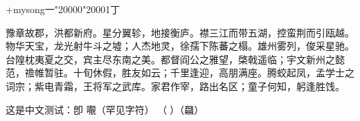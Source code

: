 \documentclass{ctexart}
\newcommand*{\mysongti}{\CJKfamily+{mysong}}
\begin{document}
\mysongti{一\char"20000\char"20001丁} %

豫章故郡，洪都新府。星分翼轸，地接衡庐。襟三江而带五湖，控蛮荆而引瓯越。物华天宝，龙光射牛斗之墟；人杰地灵，徐孺下陈蕃之榻。雄州雾列，俊采星驰。台隍枕夷夏之交，宾主尽东南之美。都督阎公之雅望，棨戟遥临；宇文新州之懿范，䄡帷暂驻。十旬休假，胜友如云；千里逢迎，高朋满座。腾蛟起凤，孟学士之词宗；紫电青霜，王将军之武库。家君作宰，路出名区；童子何知，躬逢胜饯。

这是中文测试：卽 𡃁（罕见字符）
（𮸽）（飝）
\end{document}
